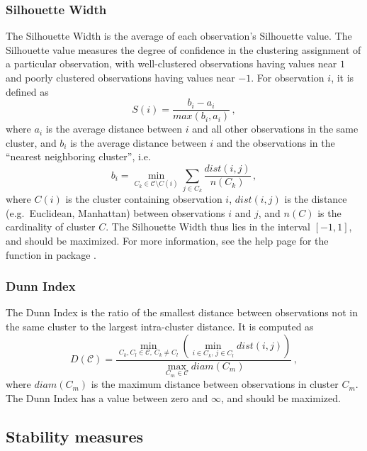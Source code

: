 \documentclass[11pt]{article}
\begin{document}
\subsubsection*{Silhouette Width}

The Silhouette Width is the average of each observation's Silhouette
value.
The Silhouette value  measures the
degree of confidence in the clustering assignment of a particular
observation, with
well-clustered observations having values
near $1$ and poorly clustered observations having values near $-1$.  For
observation $i$, it is defined as
$$ 
S(i) = \frac{b_i - a_i}{max(b_i, a_i)}\,,
$$
where $a_i$ is the average distance between $i$ and all other
observations in the same cluster, and $b_i$ is the average distance
between $i$ and the observations in the ``nearest neighboring
cluster'', i.e. %
$$
b_i = \min\limits_{C_k \in \mathcal{C}\setminus C(i)} \sum\limits_{j \in C_k}\frac{dist(i,j)}{n(C_k)}\,,
$$
where $C(i)$ is the cluster containing observation $i$, $dist(i,j)$ is
the distance (e.g.~Euclidean, Manhattan) between observations $i$ and $j$, and $n(C)$ is the
cardinality of cluster $C$.  The Silhouette Width thus lies in the interval
$[-1,1]$, and should be maximized.  
For more information, see the help page for the 
function in package  \citep{cluster}.

\subsubsection*{Dunn Index}

The Dunn Index is the ratio of the smallest distance between
observations not in the same cluster to the largest intra-cluster
distance.  It is computed as 
$$
D(\mathcal{C}) = \frac{\min\limits_{C_k, C_l \in \mathcal{C}, \,C_k
    \neq C_l} \left(\min\limits_{i\in C_k, \,j\in C_l} dist(i,j)\right)}{\max\limits_{C_m \in \mathcal{C}}
    diam(C_m)} \,,
$$
where $diam(C_m)$ is the maximum distance between observations in
cluster $C_m$.
The Dunn Index has a value between zero and $\infty$, and should be maximized.




\subsection{Stability measures}
\label{subsec:stability}
\end{document}
